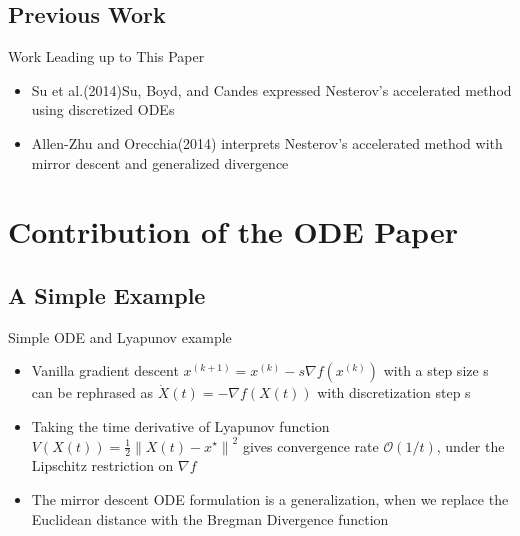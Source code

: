 \documentclass[english]{beamer}
\begin{document}
\subsection{Previous Work}
\begin{frame}{Work Leading up to This Paper}
\begin{itemize}
\item<1-> Su et al.(2014)Su, Boyd, and Candes expressed Nesterov's accelerated method using discretized ODEs

\item<2-> Allen-Zhu and Orecchia(2014) interprets Nesterov's accelerated method with mirror descent and generalized divergence
\end{itemize}
\end{frame}

\section{Contribution of the ODE Paper}

\subsection{A Simple Example}
\begin{frame}{Simple ODE and Lyapunov example}
\begin{itemize}
\item Vanilla gradient descent $x^{(k+1)}=x^{(k)}-s \nabla f\left(x^{(k)}\right)$ with a step size s can be rephrased as $\dot{X}(t)=-\nabla f(X(t))$ with discretization step s
\pause{}

\item Taking the time derivative of Lyapunov function $V(X(t))=\frac{1}{2}\left\|X(t)-x^{\star}\right\|^{2}$ gives convergence rate $\mathcal{O}(1 / t)$, under the Lipschitz restriction on $\nabla f$
\pause{}

\item The mirror descent ODE formulation is a generalization, when we replace the Euclidean distance with the Bregman Divergence function

\end{itemize}
\end{frame}
\end{document}
